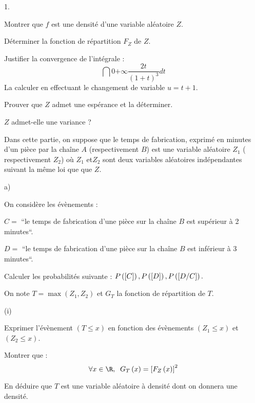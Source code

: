 \documentclass[11pt]{article}%
\begin{document}
\begin{noliste}{1.}
 \setlength{\itemsep}{4mm}
\item Montrer que $f$ est une densité d'une variable aléatoire $Z$.

\item Déterminer la fonction de répartition $F_{Z}$ de $Z$.

\item Justifier la convergence de l'intégrale : 
\[
\dint{0}{+ \infty }\dfrac{2t}{\left( 1 + t\right) ^{3}}dt
\]
La calculer en effectuant le changement de variable $u = t + 1$.

\item Prouver que $Z$ admet une espérance et la déterminer.

\item $Z$ admet-elle une variance ?

\item Dans cette partie, on suppose que le temps de fabrication,
exprimé en
minutes d'un pièce par la chaîne $A$ (respectivement $B$) est une
variable aléatoire $Z_{1}$ ( respectivement $Z_{2}$) où $Z_{1}$
et$Z_{2}$ sont deux variables aléatoires indépendantes suivant la même
loi que que $Z$.

\begin{noliste}{a)}
 \setlength{\itemsep}{2mm}
\item On considère les évènements :

$C = $ \textquotedblleft le temps de fabrication d'une pièce sur la
chaîne $B$
est supérieur à 2 minutes\textquotedblleft.

$D = $ \textquotedblleft le temps de fabrication d'une pièce sur la
chaîne $B$
est inférieur à 3 minutes\textquotedblleft.

Calculer les probabilités suivante : $P\left(\left[ { C} \right]\right),P\left(\left[ {
D} \right]\right),P\left(\left[ { D/C} \right]\right).$

\item On note $T = \max (Z_{1},Z_{2})$ et $G_{T}$ la fonction de
répartition
de $T$.

\begin{nonoliste}{(i)}
\item Exprimer l'évènement $\left( T\leq x\right) $ en fonction des
évènements $\left( Z_{1}\leq x\right) $ et $\left( Z_{2}\leq x\right)
$.

\item Montrer que : 
\[
\forall x\in \R,\;\;G_{T}\left( x\right) = \left[ F_{Z}\left(
x\right) \right] ^{2}
\]
\end{nonoliste}

\item En déduire que $T$ est une variable aléatoire à densité dont on
donnera une densité.
\end{noliste}
\end{noliste}
\end{document}
